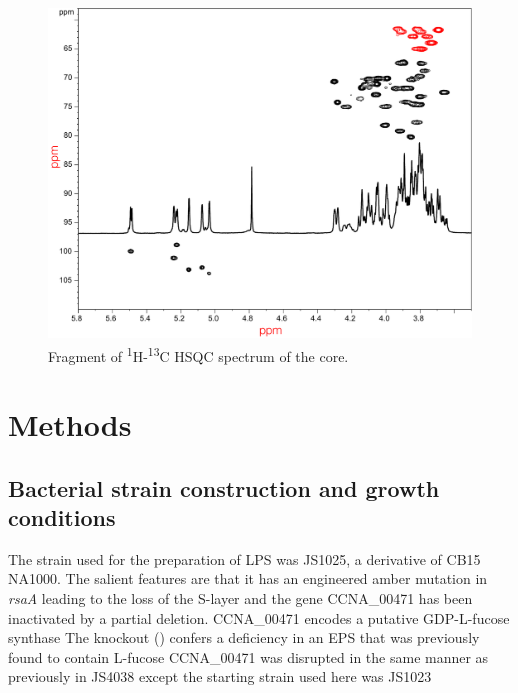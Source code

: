 		\begin{figure}[htb]
			\begin{center}
				\includegraphics[width=\textwidth]{lps_chapter/img/lpsfig4.pdf}
			\end{center}
			\caption{Fragment of \textsuperscript{1}H-\textsuperscript{13}C \ac{HSQC} spectrum of the core.}
			\label{fig:lpscorenmr}	
		\end{figure}


\section{Methods} %
\label{sec:lps_methods}

	\subsection{Bacterial strain construction and growth conditions} %
	\label{sub:bacterial_strain_construction_and_growth_conditions}

  The strain used for the preparation of \ac{LPS} was JS1025, a derivative of \caulobacter CB15
  NA1000. The salient features are that it has an engineered amber mutation in \textit{rsaA} leading
  to the loss of the \ac{S-layer} and the gene CCNA\_00471 has been inactivated by a partial
  deletion. CCNA\_00471 encodes a putative GDP-L-fucose synthase The
  knockout () confers a deficiency in an \ac{EPS} that was previously found to contain
  L-fucose CCNA\_00471 was disrupted in the same manner as previously in
  JS4038 except the starting strain used here was
  JS1023
		
